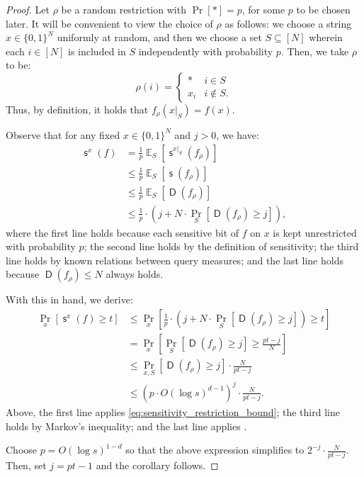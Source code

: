 \documentclass[10pt,a4paper]{article}
\newcommand{\E}{\mathop{\mathbb{E}}}
\DeclareMathOperator{\D}{\mathsf{D}}
\DeclareMathOperator{\s}{\mathsf{s}}
\begin{document}
\begin{proof}
Let $\rho$ be a random restriction with $\Pr[*] = p$, for some $p$ to be chosen later. It will be convenient to view the choice of $\rho$ as follows: we choose a string $x \in \{0,1\}^N$ uniformly at random, and then we choose a set $S \subseteq [N]$ wherein each $i \in [N]$ is included in $S$ independently with probability $p$. Then, we take $\rho$ to be:
\[\rho(i) = \begin{cases} * & i \in S\\ x_i & i \not\in S. \end{cases}\]
Thus, by definition, it holds that $f_\rho(x|_S) = f(x)$.

Observe that for any fixed $x \in \{0,1\}^N$ and $j > 0$, we have:
\begin{align}
\s^x(f)
&=\frac{1}{p}\E_S\left[\s^{x|_S}(f_\rho) \right]\nonumber\\
&\le \frac{1}{p}\E_S\left[\s(f_\rho) \right]\nonumber\\
&\le \frac{1}{p}\E_S\left[\D(f_\rho) \right]\nonumber\\
&\le \frac{1}{p} \cdot \left(j + N \cdot \Pr_S\left[\D(f_\rho) \ge j\right] \right),\label{eq:sensitivity_restriction_bound}
\end{align}
where the first line holds because each sensitive bit of $f$ on $x$ is kept unrestricted with probability $p$; the second line holds by the definition of sensitivity; the third line holds by known relations between query measures; and the last line holds because $\D(f_\rho) \le N$ always holds.

With this in hand, we derive:
\begin{align*}
\Pr_x\left[\s^x(f) \ge t\right]
&\le \Pr_x\left[ \frac{1}{p} \cdot \left(j + N \cdot \Pr_S\left[\D(f_\rho) \ge j\right] \right) \ge t \right]\\
&= \Pr_x\left[\Pr_S\left[\D(f_\rho) \ge j\right] \ge \frac{pt - j}{N} \right]\\
&\le  \Pr_{x,S}\left[\D(f_\rho) \ge j\right] \cdot \frac{N}{pt - j}\\
&\le \left(p \cdot O\left(\log s\right)^{d-1}\right)^j \cdot \frac{N}{pt - j}.
\end{align*}
Above, the first line applies \eqref{eq:sensitivity_restriction_bound}; the third line holds by Markov's inequality; and the last line applies .

Choose $p = O\left(\log s\right)^{1-d}$ so that the above expression simplifies to $2^{-j} \cdot \frac{N}{pt - j}$. Then, set $j = pt - 1$ and the corollary follows.
\end{proof}
\end{document}
